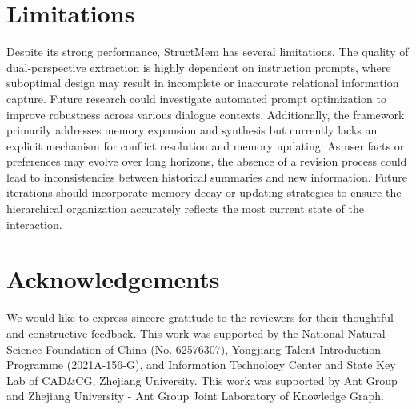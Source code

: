 \section*{Limitations}
Despite its strong performance, StructMem has several limitations. The quality of dual-perspective extraction is highly dependent on instruction prompts, where suboptimal design may result in incomplete or inaccurate relational information capture. Future research could investigate automated prompt optimization to improve robustness across various dialogue contexts. Additionally, the framework primarily addresses memory expansion and synthesis but currently lacks an explicit mechanism for conflict resolution and memory updating. As user facts or preferences may evolve over long horizons, the absence of a revision process could lead to inconsistencies between historical summaries and new information. Future iterations should incorporate memory decay or updating strategies to ensure the hierarchical organization accurately reflects the most current state of the interaction.


\section*{Acknowledgements}
We would like to express sincere gratitude to the  reviewers for their thoughtful and constructive feedback. This work was supported by the National Natural Science Foundation of China (No. 62576307), Yongjiang Talent Introduction Programme (2021A-156-G), and Information Technology Center and State Key Lab of CAD\&CG, Zhejiang University. This work was supported by Ant Group and Zhejiang University - Ant Group Joint Laboratory of Knowledge Graph.